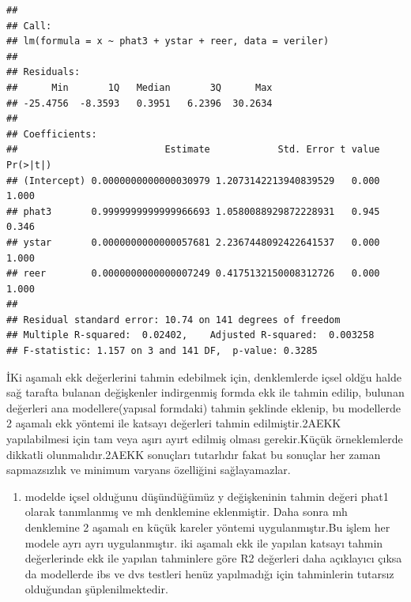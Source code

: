 \documentclass[]{article}
\newenvironment{Shaded}{\begin{snugshade}}{\end{snugshade}}
\newcommand{\KeywordTok}[1]{\textcolor[rgb]{0.13,0.29,0.53}{\textbf{#1}}}
\newcommand{\DataTypeTok}[1]{\textcolor[rgb]{0.13,0.29,0.53}{#1}}
\newcommand{\StringTok}[1]{\textcolor[rgb]{0.31,0.60,0.02}{#1}}
\newcommand{\OperatorTok}[1]{\textcolor[rgb]{0.81,0.36,0.00}{\textbf{#1}}}
\newcommand{\NormalTok}[1]{#1}
\providecommand{\tightlist}{%
  \setlength{\itemsep}{0pt}\setlength{\parskip}{0pt}}
\begin{document}
\begin{Shaded}
\end{Shaded}

\begin{verbatim}
## 
## Call:
## lm(formula = x ~ phat3 + ystar + reer, data = veriler)
## 
## Residuals:
##      Min       1Q   Median       3Q      Max 
## -25.4756  -8.3593   0.3951   6.2396  30.2634 
## 
## Coefficients:
##                          Estimate            Std. Error t value Pr(>|t|)
## (Intercept) 0.0000000000000030979 1.2073142213940839529   0.000    1.000
## phat3       0.9999999999999966693 1.0580088929872228931   0.945    0.346
## ystar       0.0000000000000057681 2.2367448092422641537   0.000    1.000
## reer        0.0000000000000007249 0.4175132150008312726   0.000    1.000
## 
## Residual standard error: 10.74 on 141 degrees of freedom
## Multiple R-squared:  0.02402,    Adjusted R-squared:  0.003258 
## F-statistic: 1.157 on 3 and 141 DF,  p-value: 0.3285
\end{verbatim}

İKi aşamalı ekk değerlerini tahmin edebilmek için, denklemlerde içsel
oldğu halde sağ tarafta bulanan değişkenler indirgenmiş formda ekk ile
tahmin edilip, bulunan değerleri ana modellere(yapısal formdaki) tahmin
şeklinde eklenip, bu modellerde 2 aşamalı ekk yöntemi ile katsayı
değerleri tahmin edilmiştir.2AEKK yapılabilmesi için tam veya aşırı
ayırt edilmiş olması gerekir.Küçük örneklemlerde dikkatli
olunmalıdır.2AEKK sonuçları tutarlıdır fakat bu sonuçlar her zaman
sapmazsızlık ve minimum varyans özelliğini sağlayamazlar.

\begin{enumerate}
\def\labelenumi{\arabic{enumi}.}
\tightlist
\item
  modelde içsel olduğunu düşündüğümüz y değişkeninin tahmin değeri phat1
  olarak tanımlanmış ve mh denklemine eklenmiştir. Daha sonra mh
  denklemine 2 aşamalı en küçük kareler yöntemi uygulanmıştır.Bu işlem
  her modele ayrı ayrı uygulanmıştır. iki aşamalı ekk ile yapılan
  katsayı tahmin değerlerinde ekk ile yapılan tahminlere göre R2
  değerleri daha açıklayıcı çıksa da modellerde ibs ve dvs testleri
  henüz yapılmadığı için tahminlerin tutarsız olduğundan
  şüplenilmektedir.
\end{enumerate}
\end{document}
